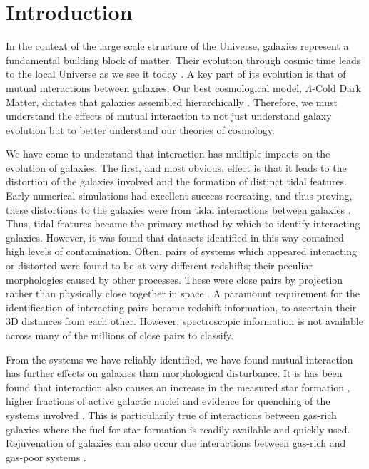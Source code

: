 \chapter{Introduction}\label{chapter:introduction}
In the context of the large scale structure of the Universe, galaxies represent a fundamental building block of matter. Their evolution through cosmic time leads to the local Universe as we see it today \citep{2005Natur.435..629S}. A key part of its evolution is that of mutual interactions between galaxies. Our best cosmological model, $\Lambda$-Cold Dark Matter, dictates that galaxies assembled hierarchically \citep{1978MNRAS.183..341W, 1991ApJ...379...52W}. Therefore, we must understand the effects of mutual interaction to not just understand galaxy evolution but to better understand our theories of cosmology.

We have come to understand that interaction has multiple impacts on the evolution of galaxies. The first, and most obvious, effect is that it leads to the distortion of the galaxies involved and the formation of distinct tidal features. Early numerical simulations had excellent success recreating, and thus proving, these distortions to the galaxies were from tidal interactions between galaxies \citep{1972ApJ...178..623T}. Thus, tidal features became the primary method by which to identify interacting galaxies.  However, it was found that datasets identified in this way contained high levels of contamination. Often, pairs of systems which appeared interacting or distorted were found to be at very different redshifts; their peculiar morphologies caused by other processes. These were close pairs by projection rather than physically close together in space \citep[e.g][]{2018MNRAS.479..415A, 2020MNRAS.492.2075B, 2022A&A...661A..52P}. A paramount requirement for the identification of interacting pairs became redshift information, to ascertain their 3D distances from each other. However, spectroscopic information is not available across many of the millions of close pairs to classify.

From the systems we have reliably identified, we have found mutual interaction has further effects on galaxies than morphological disturbance. It is has been found that interaction also causes an increase in the measured star formation \citep{1987ApJ...320...49B, 1992ApJ...400..153M}, higher fractions of active galactic nuclei \citep{2008AJ....135.1877E, 2014MNRAS.441.1297S} and evidence for quenching of the systems involved \citep{1992AJ....104.1039S, 2010MNRAS.407..749G}. This is particularily true of interactions between gas-rich galaxies where the fuel for star formation is readily available and quickly used. Rejuvenation of galaxies can also occur due interactions between gas-rich and gas-poor systems \citep{1992AJ....104.1039S, 2009ApJ...691.1168H}.

